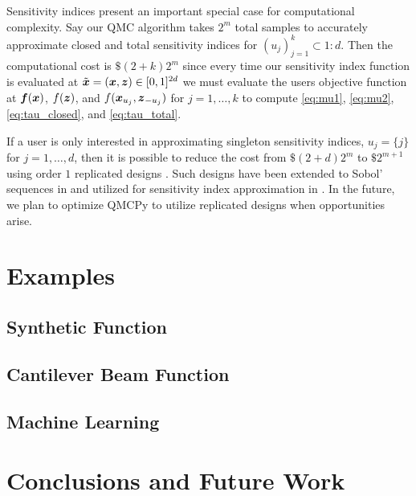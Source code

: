 \documentclass{article}[12pt]
\begin{document}
Sensitivity indices present an important special case for computational complexity. Say our QMC algorithm takes $2^m$ total samples to accurately approximate closed and total sensitivity indices for $(u_j)_{j=1}^k \subset 1:d$. Then the computational cost is $\$(2+k)2^m$ since every time our sensitivity index function is evaluated at $\tilde{\boldsymbol{x}} = (\boldsymbol{x},\boldsymbol{z}) \in [0,1]^{2d}$ we must evaluate the users objective function at $\boldsymbol{f}(\boldsymbol{x})$, $f(\boldsymbol{z})$, and $f(\boldsymbol{x}_{u_j},\boldsymbol{z}_{-{u_j}})$ for $j=1,\dots,k$ to compute \eqref{eq:mu1}, \eqref{eq:mu2}, \eqref{eq:tau_closed}, and \eqref{eq:tau_total}.

If a user is only interested in approximating singleton sensitivity indices, $u_j = \{j\}$ for $j=1,\dots,d$, then it is possible to reduce the cost from $\$(2+d)2^m$ to $\$2^{m+1}$ using order $1$ replicated designs \cite{alex2008comparison,tissot2015randomized}. Such designs have been extended to  Sobol' sequences  in \cite{replicated_designs_sobol_seq} and utilized for sensitivity index approximation in \cite{reliable_sobol_indices_approx}. In the future, we plan to optimize QMCPy to utilize replicated designs when opportunities arise.

\section{Examples}

\subsection{Synthetic Function}


\subsection{Cantilever Beam Function}


\subsection{Machine Learning}


\section{Conclusions and Future Work}

\printbibliography
\end{document}
